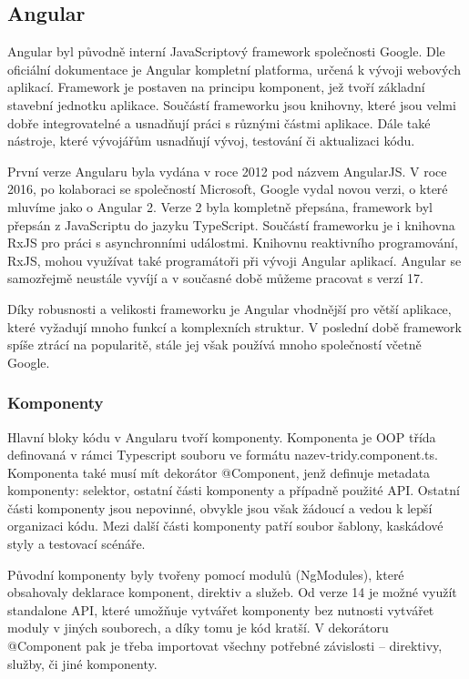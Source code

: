 \subsection{Angular}

Angular byl původně interní JavaScriptový framework společnosti Google. 
Dle oficiální dokumentace \cite{angulario} je Angular kompletní platforma, určená k vývoji webových aplikací. 
Framework je postaven na principu komponent, jež tvoří základní stavební jednotku aplikace. 
Součástí frameworku jsou knihovny, které jsou velmi dobře integrovatelné a usnadňují práci s různými částmi aplikace. 
Dále také nástroje, které vývojářům usnadňují vývoj, testování či aktualizaci kódu.\cite{angulario,learningangular}

První verze Angularu byla vydána v roce 2012 pod názvem AngularJS. 
V roce 2016, po kolaboraci se společností Microsoft, Google vydal novou verzi, o které mluvíme jako o Angular 2. 
Verze 2 byla kompletně přepsána, framework byl přepsán z JavaScriptu do jazyku TypeScript. 
Součástí frameworku je i knihovna RxJS pro práci s asynchronními událostmi. 
Knihovnu reaktivního programování, RxJS, mohou využívat také programátoři při vývoji Angular aplikací. 
Angular se samozřejmě neustále vyvíjí a v současné době můžeme pracovat s verzí 17.\cite{angulardev,learningangular}

Díky robusnosti a velikosti frameworku je Angular vhodnější pro větší aplikace, které vyžadují mnoho funkcí a komplexních struktur. 
V poslední době framework spíše ztrácí na popularitě, stále jej však používá mnoho společností včetně Google.\cite{learningangular}

\subsubsection{Komponenty}

Hlavní bloky kódu v Angularu tvoří komponenty. Komponenta je OOP třída definovaná v rámci Typescript souboru ve formátu nazev-tridy.component.ts. 
Komponenta také musí mít dekorátor @Component, jenž definuje metadata komponenty: selektor, ostatní části komponenty a případně použité API. 
Ostatní části komponenty jsou nepovinné, obvykle jsou však žádoucí a vedou k lepší organizaci kódu. 
Mezi další části komponenty patří soubor šablony, kaskádové styly a testovací scénáře.

Původní komponenty byly tvořeny pomocí modulů (NgModules), které obsahovaly deklarace komponent, direktiv a služeb. 
Od verze 14 je možné využít standalone API, které umožňuje vytvářet komponenty bez nutnosti vytvářet moduly v jiných souborech, a díky tomu je kód kratší. 
V dekorátoru @Component pak je třeba importovat všechny potřebné závislosti -- direktivy, služby, či jiné komponenty.\cite{angulardev,learningangular}

